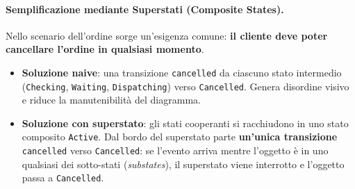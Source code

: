 \documentclass[12pt]{extarticle}
\begin{document}
\paragraph{Semplificazione mediante Superstati (Composite States).}
Nello scenario dell'ordine sorge un'esigenza comune: \textbf{il cliente deve poter cancellare l'ordine in qualsiasi momento}.
\begin{itemize}
    \item \textbf{Soluzione naive}: una transizione \texttt{cancelled} da ciascuno stato intermedio (\texttt{Checking}, \texttt{Waiting}, \texttt{Dispatching}) verso \texttt{Cancelled}. Genera disordine visivo e riduce la manutenibilità del diagramma.
    \item \textbf{Soluzione con superstato}: gli stati cooperanti si racchiudono in uno stato composito \texttt{Active}. Dal bordo del superstato parte \textbf{un'unica transizione} \texttt{cancelled} verso \texttt{Cancelled}: se l'evento arriva mentre l'oggetto è in uno qualsiasi dei sotto-stati (\textit{substates}), il superstato viene interrotto e l'oggetto passa a \texttt{Cancelled}.
\end{itemize}
\end{document}
